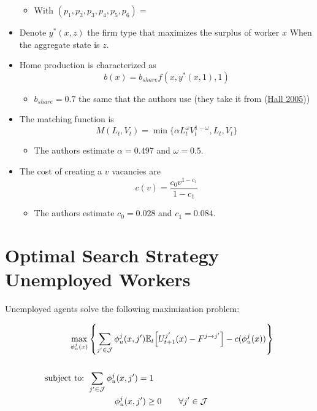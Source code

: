 \documentclass[
  letterpaper,
  DIV=11,
  numbers=noendperiod]{scrreprt}
\providecommand{\tightlist}{%
  \setlength{\itemsep}{0pt}\setlength{\parskip}{0pt}}\usepackage{longtable,booktabs,array}
\begin{document}
\begin{itemize}
  \begin{itemize}
  \tightlist
  \item
    With \((p_1, p_2, p_3, p_4, p_5, p_6) =\)
  \end{itemize}
\item
  Denote \(y^*(x,z)\) the firm type that maximizes the surplus of worker
  \(x\) When the aggregate state is \(z\).
\item
  Home production is characterized as
  \[b(x) = b_{share} f(x,y^*(x,1),1)\]

  \begin{itemize}
  \tightlist
  \item
    \(b_{share} = 0.7\) the same that the authors use (they take it from
    (\protect\hyperlink{ref-hallEmploymentFluctuationsEquilibrium2005}{Hall
    2005}))
  \end{itemize}
\item
  The matching function is
  \[M(L_t, V_t) = \min\{\alpha L_t^{\omega}V_t^{1-\omega}, L_t, V_t\}\]

  \begin{itemize}
  \tightlist
  \item
    The authors estimate \(\alpha = 0.497\) and \(\omega=0.5\).
  \end{itemize}
\item
  The cost of creating a \(v\) vacancies are
  \[c(v) = \frac{c_0 v^{1-c_1}}{1 - c_1}\]

  \begin{itemize}
  \tightlist
  \item
    The authors estimate \(c_0 = 0.028\) and \(c_1 = 0.084\).
  \end{itemize}
\end{itemize}

\cleardoublepage
{}
{}
\appendix

\hypertarget{sec-appendix_search_unemp}{%
\chapter{Optimal Search Strategy Unemployed
Workers}\label{sec-appendix_search_unemp}}

Unemployed agents solve the following maximization problem:

\begin{align*}
    \max_{\phi^j_u(x)}&\left\{ \sum_{j'\in\mathcal{J}}\phi^j_u(x, j')\mathbb{E}_t\Big[U^{j'}_{t+1}(x) - F^{j \to j'}  \Big] -c(\phi^j_u(x)) \right\} \\ \\
    \text{subject to: } & \sum_{j'\in \mathcal{J}}\phi^j_u(x, j') = 1 \\
    & \hspace{1.1 cm} \phi^j_u(x, j') \geq 0 \qquad \forall j'\in \mathcal{J}
\end{align*}
\end{document}

